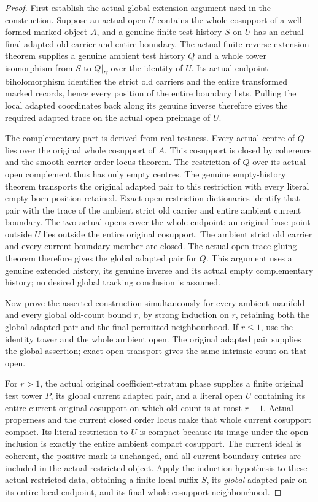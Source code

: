 \begin{proof}
First establish the actual global extension argument used in the
construction. Suppose an actual open $U$ contains the whole cosupport
of a well-formed marked object $A$, and a genuine finite test history
$S$ on $U$ has an actual final adapted old carrier and entire boundary.
The actual finite reverse-extension theorem supplies a genuine ambient
test history $Q$ and a whole tower isomorphism from $S$ to $Q|_U$ over
the identity of $U$. Its actual endpoint biholomorphism identifies the
strict old carriers and the entire transformed marked records, hence
every position of the entire boundary lists. Pulling the local adapted
coordinates back along its genuine inverse therefore gives the required
adapted trace on the actual open preimage of $U$.

The complementary part is derived from real testness. Every actual
centre of $Q$ lies over the original whole cosupport of $A$. This
cosupport is closed by coherence and the smooth-carrier order-locus
theorem. The restriction of $Q$ over its actual open complement thus has
only empty centres. The genuine empty-history theorem transports the
original adapted pair to this restriction with every literal empty born
position retained. Exact open-restriction dictionaries identify that
pair with the trace of the ambient strict old carrier and entire ambient
current boundary. The two actual opens cover the whole endpoint: an
original base point outside $U$ lies outside the entire original
cosupport. The ambient strict old carrier and every current boundary
member are closed. The actual open-trace gluing theorem therefore gives
the global adapted pair for $Q$. This argument uses a genuine extended
history, its genuine inverse and its actual empty complementary history;
no desired global tracking conclusion is assumed.

Now prove the asserted construction simultaneously for every ambient
manifold and every global old-count bound $r$, by strong induction on
$r$, retaining both the global adapted pair and the final permitted
neighbourhood. If $r\le1$, use the identity tower and the whole ambient
open. The original adapted pair supplies the global assertion; exact
open transport gives the same intrinsic count on that open.

For $r>1$, the actual original coefficient-stratum phase supplies a
finite original test tower $P$, its global current adapted pair, and a
literal open $U$ containing its entire current original cosupport on
which old count is at most $r-1$. Actual properness and the current
closed order locus make that whole current cosupport compact. Its
literal restriction to $U$ is compact because its image under the open
inclusion is exactly the entire ambient compact cosupport. The current
ideal is coherent, the positive mark is unchanged, and all current
boundary entries are included in the actual restricted object. Apply
the induction hypothesis to these actual restricted data, obtaining a
finite local suffix $S$, its \emph{global} adapted pair on its entire
local endpoint, and its final whole-cosupport neighbourhood.


\end{proof}
